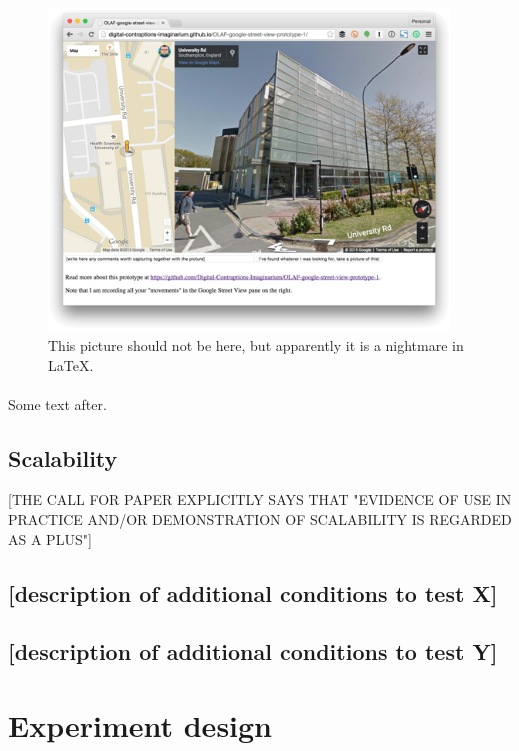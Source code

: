 \documentclass{llncs}
\begin{document}
{    \begin{figure}
    	\includegraphics[width=0.95\textwidth]{some_picture.png}
    	\caption{This picture should not be here, but apparently it is a nightmare in LaTeX.}
    	\label{fig:some_figure}
    \end{figure}
    
    \paragraph{}
    
    Some text after.
	
\subsection{Scalability}

    [THE CALL FOR PAPER EXPLICITLY SAYS THAT "EVIDENCE OF USE IN PRACTICE AND/OR DEMONSTRATION OF SCALABILITY IS REGARDED AS A PLUS"]

\subsection{{[}description of additional conditions to test X{]}}
\subsection{{[}description of additional conditions to test Y{]}}

\section{Experiment design}

}
\end{document}
